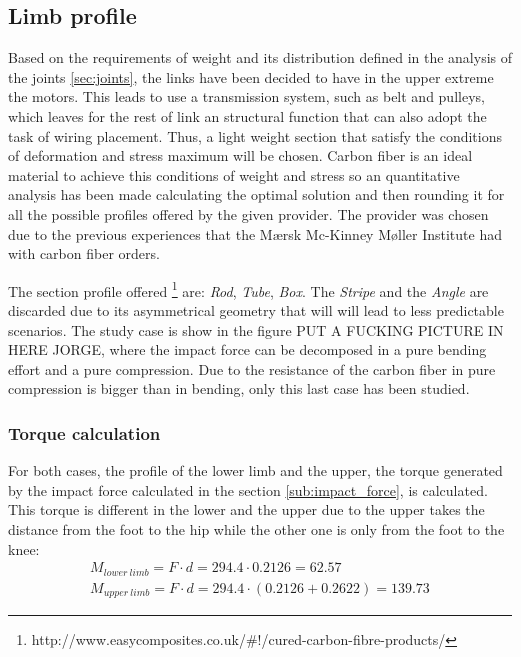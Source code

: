 \subsection{Limb profile} %
\label{sub:limb_profile}
Based on the requirements of weight and its distribution defined in the analysis of the joints \ref{sec:joints}, the links have been decided to have in the upper extreme the motors. 
This leads to use a transmission system, such as belt and pulleys, which leaves for the rest of link an structural function that can also adopt the task of wiring placement.
Thus, a light weight section that satisfy the conditions of deformation and stress maximum will be chosen.
Carbon fiber is an ideal material to achieve this conditions of weight and stress so an quantitative analysis has been made calculating the optimal solution and then rounding it for all the possible profiles offered by the given provider.
The provider was chosen due to the previous experiences that the Mærsk Mc-Kinney Møller Institute had with carbon fiber orders.

The section profile offered \footnote{http://www.easycomposites.co.uk/\#!/cured-carbon-fibre-products/} are: \textit{Rod}, \textit{Tube}, \textit{Box}. The \textit{Stripe} and the \textit{Angle} are discarded due to its asymmetrical geometry that will will lead to less predictable scenarios.
The study case is show in the figure PUT A FUCKING PICTURE IN HERE JORGE, where the impact force can be decomposed in a pure bending effort and a pure compression.
Due to the resistance of the carbon fiber in pure compression is bigger than in bending, only this last case has been studied.

\subsubsection{Torque calculation} %
\label{ssub:torque_calculation}
  For both cases, the profile of the lower limb and the upper, the torque generated by the impact force calculated in the section \ref{sub:impact_force}, is calculated.
  This torque is different in the lower and the upper due to the upper takes the distance from the foot to the hip while the other one is only from the foot to the knee:
  \begin{equation}
  \begin{aligned}
     M_{lower\ limb} = F \cdot d = 294.4 \cdot 0.2126 = 62.57 \\
     M_{upper\ limb} = F \cdot d = 294.4 \cdot (0.2126 + 0.2622) = 139.73
  \end{aligned}
  \end{equation}

